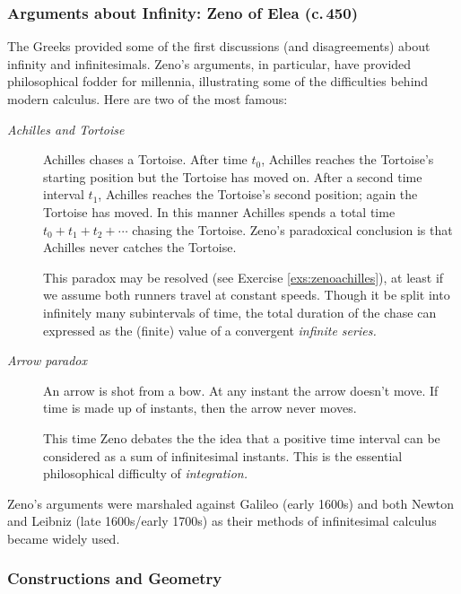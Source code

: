 \subsubsection*{Arguments about Infinity: Zeno of Elea (c.\,450\BC)}\label{pg:zeno}

The Greeks provided some of the first discussions (and disagreements) about infinity and infinitesimals. Zeno's arguments, in particular, have provided philosophical fodder for millennia, illustrating some of the difficulties behind modern calculus. Here are two of the most famous:
\begin{description}
  \item[\normalfont\emph{Achilles and Tortoise}] Achilles chases a Tortoise. After time $t_0$, Achilles reaches the Tortoise's starting position but the Tortoise has moved on. After a second time interval $t_1$, Achilles reaches the Tortoise's second position; again the Tortoise has moved. In this manner Achilles spends a total time $t_0+t_1+t_2+\cdots$ chasing the Tortoise. Zeno's paradoxical conclusion is that Achilles never catches the Tortoise.\par
  This paradox may be resolved (see Exercise \ref{exs:zenoachilles}), at least if we assume both runners travel at constant speeds. Though it be split into infinitely many subintervals of time, the total duration of the chase can expressed as the (finite) value of a convergent \emph{infinite series.}
  \item[\normalfont\emph{Arrow paradox}] An arrow is shot from a bow. At any instant the arrow doesn't move. If time is made up of instants, then the arrow never moves.\par
  This time Zeno debates the the idea that a positive time interval can be considered as a sum of infinitesimal instants. This is the essential philosophical difficulty of \emph{integration.}
\end{description}

Zeno's arguments were marshaled against Galileo (early 1600s) and both Newton and Leibniz (late 1600s/early 1700s) as their methods of infinitesimal calculus became widely used.


\subsubsection*{Constructions and Geometry}\label{pg:construction}

